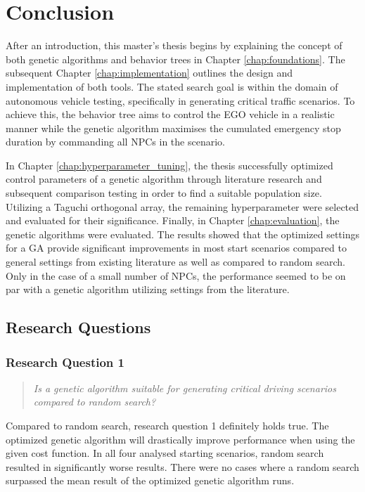 \chapter{Conclusion}
After an introduction, this master's thesis begins by explaining the concept of both genetic algorithms and behavior trees in Chapter \ref{chap:foundations}. The subsequent Chapter \ref{chap:implementation} outlines the design and implementation of both tools. The stated search goal is within the domain of autonomous vehicle testing, specifically in generating critical traffic scenarios. To achieve this, the behavior tree aims to control the EGO vehicle in a realistic manner while the genetic algorithm maximises the cumulated emergency stop duration by commanding all NPCs in the scenario. 

In Chapter \ref{chap:hyperparameter_tuning}, the thesis successfully optimized control parameters of a genetic algorithm through literature research and subsequent comparison testing in order to find a suitable population size. Utilizing a Taguchi orthogonal array, the remaining hyperparameter were selected and evaluated for their significance. Finally, in Chapter \ref{chap:evaluation}, the genetic algorithms were evaluated. The results showed that the optimized settings for a GA provide significant improvements in most start scenarios compared to general settings from existing literature as well as compared to random search. Only in the case of a small number of NPCs, the performance seemed to be on par with a genetic algorithm utilizing settings from the literature.

\section{Research Questions}
\subsection{Research Question 1}
\begin{quote}
	\begin{em}
		\textit{Is a genetic algorithm suitable for generating critical driving scenarios compared to random search?}
	\end{em}
\end{quote}

Compared to random search, research question 1 definitely holds true. The optimized genetic algorithm will drastically improve performance when using the given cost function. In all four analysed starting scenarios, random search resulted in significantly worse results. There were no cases where a random search surpassed the mean result of the optimized genetic algorithm runs.

